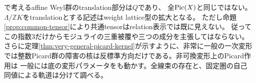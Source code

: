 \cite{OWR}で考えるaffine Weyl群のtranslation部分は$Q$であり、
全$\operatorname{Pic}(X)$と同じではない。
$\Lambda/\mathbb ZK$をtranslationとする記述はweight lattice型の拡大となる。
ただし命題\ref{prop:common-tensor}により共通tensorはrelation表示では既に見えない。
従ってこの指数3だけからモジュライの三重被覆や三つの成分を主張してはならない。
さらに定理\ref{thm:very-general-picard-kernel}が示すように、非常に一般の一次変形では整数Picard群の障害の核は反標準方向だけである。非可換変形上のPicard作用は
一般には底の変形パラメータをも動かす。全線束の存在と、固定圏の自己同値による軌道は分けて調べる。
